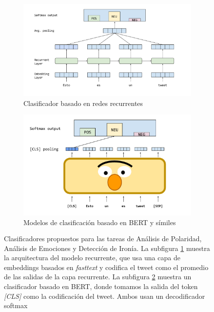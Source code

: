 \begin{figure}
    \centering
    \begin{subfigure}[t]{\textwidth}
        \centering
        \includegraphics[width=\textwidth]{img/03/recurrent_classifier.pdf}
        \caption{Clasificador basado en redes recurrentes}
        \label{subfig:rnn_classifier}
    \end{subfigure}
    \begin{subfigure}[t]{\textwidth}
        \centering
        \includegraphics[width=\textwidth]{img/03/bert_classifier.pdf}
        \caption{Modelos de clasificación basado en BERT y símiles}
        \label{subfig:bert_classifier}
    \end{subfigure}

    \caption{Clasificadores propuestos para las tareas de Análisis de Polaridad, Análisis de Emociones y Detección de Ironía. La subfigura \ref{subfig:rnn_classifier} muestra la arquitectura del modelo recurrente, que usa una capa de embeddings basados en \emph{fasttext} y codifica el tweet como el promedio de las salidas de la capa recurrente. La subfigura \ref{subfig:bert_classifier} muestra un clasificador basado en BERT, donde tomamos la salida del token \emph{[CLS]} como la codificación del tweet. Ambos usan un decodificador softmax}
    \label{fig:03_classifiers}
\end{figure}

